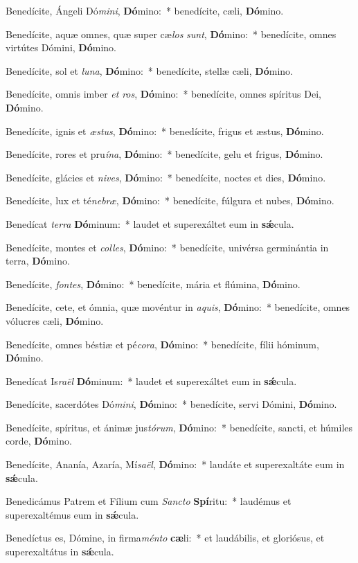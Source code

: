 \item Benedícite, Ángeli Dó\textit{mi}\textit{ni}, \textbf{Dó}mino:~* benedícite, cæli, \textbf{Dó}mino.
\item Benedícite, aquæ omnes, quæ super cæ\textit{los} \textit{sunt}, \textbf{Dó}mino:~* benedícite, omnes virtútes Dómini, \textbf{Dó}mino.
\item Benedícite, sol et \textit{lu}\textit{na}, \textbf{Dó}mino:~* benedícite, stellæ cæli, \textbf{Dó}mino.
\item Benedícite, omnis imber \textit{et} \textit{ros}, \textbf{Dó}mino:~* benedícite, omnes spíritus Dei, \textbf{Dó}mino.
\item Benedícite, ignis et \textit{æs}\textit{tus}, \textbf{Dó}mino:~* benedícite, frigus et æstus, \textbf{Dó}mino.
\item Benedícite, rores et pru\textit{í}\textit{na}, \textbf{Dó}mino:~* benedícite, gelu et frigus, \textbf{Dó}mino.
\item Benedícite, glácies et \textit{ni}\textit{ves}, \textbf{Dó}mino:~* benedícite, noctes et dies, \textbf{Dó}mino.
\item Benedícite, lux et té\textit{ne}\textit{bræ}, \textbf{Dó}mino:~* benedícite, fúlgura et nubes, \textbf{Dó}mino.
\item Benedícat \textit{ter}\textit{ra} \textbf{Dó}minum:~* laudet et superexáltet eum in \textbf{sǽ}cula.
\item Benedícite, montes et \textit{col}\textit{les}, \textbf{Dó}mino:~* benedícite, univérsa germinántia in terra, \textbf{Dó}mino.
\item Benedícite, \textit{fon}\textit{tes}, \textbf{Dó}mino:~* benedícite, mária et flúmina, \textbf{Dó}mino.
\item Benedícite, cete, et ómnia, quæ movéntur in \textit{a}\textit{quis}, \textbf{Dó}mino:~* benedícite, omnes vólucres cæli, \textbf{Dó}mino.
\item Benedícite, omnes béstiæ et pé\textit{co}\textit{ra}, \textbf{Dó}mino:~* benedícite, fílii hóminum, \textbf{Dó}mino.
\item Benedícat Is\textit{ra}\textit{ël} \textbf{Dó}minum:~* laudet et superexáltet eum in \textbf{sǽ}cula.
\item Benedícite, sacerdótes Dó\textit{mi}\textit{ni}, \textbf{Dó}mino:~* benedícite, servi Dómini, \textbf{Dó}mino.
\item Benedícite, spíritus, et ánimæ jus\textit{tó}\textit{rum}, \textbf{Dó}mino:~* benedícite, sancti, et húmiles corde, \textbf{Dó}mino.
\item Benedícite, Ananía, Azaría, Mí\textit{sa}\textit{ël}, \textbf{Dó}mino:~* laudáte et superexaltáte eum in \textbf{sǽ}cula.
\item Benedicámus Patrem et Fílium cum \textit{Sanc}\textit{to} \textbf{Spí}ritu:~* laudémus et superexaltémus eum in \textbf{sǽ}cula.
\item Benedíctus es, Dómine, in firma\textit{mén}\textit{to} \textbf{cæ}li:~* et laudábilis, et gloriósus, et superexaltátus in \textbf{sǽ}cula.
